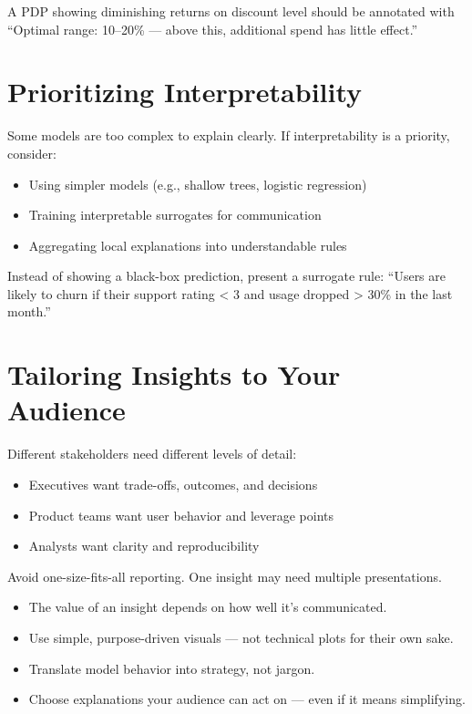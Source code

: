 \documentclass[12pt,openany]{book}
\begin{document}
\begin{examplebox}
A PDP showing diminishing returns on discount level should be annotated with “Optimal range: 10–20\% — above this, additional spend has little effect.”
\end{examplebox}

\section{Prioritizing Interpretability}

Some models are too complex to explain clearly. If interpretability is a priority, consider:
\begin{itemize}
  \item Using simpler models (e.g., shallow trees, logistic regression)
  \item Training interpretable surrogates for communication
  \item Aggregating local explanations into understandable rules
\end{itemize}

\begin{examplebox}
Instead of showing a black-box prediction, present a surrogate rule: “Users are likely to churn if their support rating < 3 and usage dropped > 30\% in the last month.”
\end{examplebox}

\section{Tailoring Insights to Your Audience}

Different stakeholders need different levels of detail:
\begin{itemize}
  \item Executives want trade-offs, outcomes, and decisions
  \item Product teams want user behavior and leverage points
  \item Analysts want clarity and reproducibility
\end{itemize}

\begin{notebox}
Avoid one-size-fits-all reporting. One insight may need multiple presentations.
\end{notebox}

\begin{summarybox}
\begin{itemize}
  \item The value of an insight depends on how well it’s communicated.
  \item Use simple, purpose-driven visuals — not technical plots for their own sake.
  \item Translate model behavior into strategy, not jargon.
  \item Choose explanations your audience can act on — even if it means simplifying.
\end{itemize}
\end{summarybox}
\end{document}
